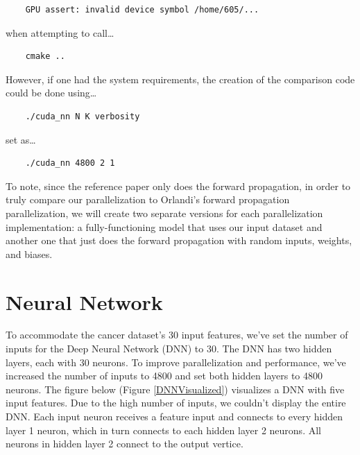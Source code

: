 \documentclass[11pt]{article}
\begin{document}
\begin{lstlisting}
    GPU assert: invalid device symbol /home/605/...
\end{lstlisting}

when attempting to call\ldots

\begin{lstlisting}
    cmake ..
\end{lstlisting}

However, if one had the system requirements, the creation of the comparison code could be done using\ldots

\begin{lstlisting}
    ./cuda_nn N K verbosity
\end{lstlisting}

set as\ldots

\begin{lstlisting}
    ./cuda_nn 4800 2 1
\end{lstlisting}

To note, since the reference paper only does the forward propagation, in order to truly compare our parallelization to Orlandi's forward propagation parallelization, we will create two separate versions for each parallelization implementation: a fully-functioning model that uses our input dataset and another one that just does the forward propagation with random inputs, weights, and biases.

\clearpage

\section{Neural Network}
To accommodate the cancer dataset's 30 input features, we've set the number of inputs for the Deep Neural Network (DNN) to 30. The DNN has two hidden layers, each with 30 neurons. To improve parallelization and performance, we've increased the number of inputs to 4800 and set both hidden layers to 4800 neurons. The figure below (Figure \ref{DNNVisualized}) visualizes a DNN with five input features. Due to the high number of inputs, we couldn't display the entire DNN. Each input neuron receives a feature input and connects to every hidden layer 1 neuron, which in turn connects to each hidden layer 2 neurons. All neurons in hidden layer 2 connect to the output vertice.
\end{document}
